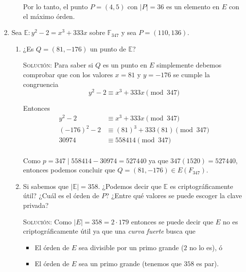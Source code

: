 \documentclass[letterpaper,11pt]{article}
\begin{document}
\begin{enumerate}
\begin{enumerate}
        Por lo tanto, el punto $P = (4, 5)$ con $|P| = 36$ es un
        elemento en $E$ con el máximo órden.
    \end{enumerate}

    \item Sea $\mathbb{E} : y^2 - 2 = x^3 + 333x$ sobre $\mathbb{F}_{347}$ y 
    sea $P = (110, 136)$. 
    \begin{enumerate}
        \item ¿Es $Q = (81, -176)$ un punto de $\mathbb{E}$?
        
        \textsc{Solución:} Para saber si $Q$ es un punto en $E$ simplemente 
        debemos comprobar que con los valores $x = 81$ y $y = -176$ se cumple
        la congruencia 
        \begin{equation*}
            y^2 - 2 \equiv x^3 + 333x \pmod{347}
        \end{equation*}
        
        Entonces
        \begin{align*}
            y^2 - 2 &\equiv x^3 + 333x \pmod{347} \\
            (-176)^2 - 2 &\equiv (81)^3 + 333(81) \pmod{347} \\
            30 974 &\equiv 558 414 \pmod{347} \\ 
        \end{align*}
        
        Como $p = 347 \; | \; 558414 - 30974 = 527 440$ ya que 
        $347(1520) = 527 440$, entonces podemos concluir que 
        $Q = (81, -176) \in E(F_{347})$.

        \item Si sabemos que $|\mathbb{E}| = 358$. ¿Podemos decir que 
        $\mathbb{E}$ es criptográficamente útil? ¿Cuál es el órden de $P$? 
        ¿Entre qué valores se puede escoger la clave privada?

        \textsc{Solución:} Como $|E| = 358 = 2 \cdot 179$ entonces se puede
        decir que $E$ no es criptográficamente útil ya que una 
        \textit{curva fuerte} busca que 
        \begin{itemize}
            \item El órden de $E$ sea divisible por un primo grande ($2$ no lo 
            es), ó 
            \item El órden de $E$ sea un primo grande (tenemos que $358$ es par).
        \end{itemize}
      

\end{enumerate}
\end{enumerate}
\end{document}
